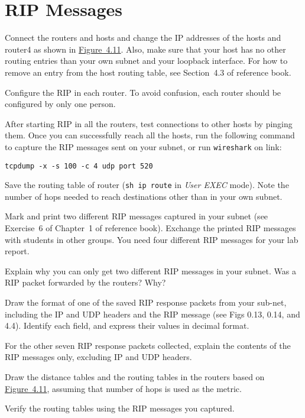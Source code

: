 \documentclass{../UTNetLab}
\begin{document}
\section{RIP Messages}
    Connect the routers and hosts and change the IP addresses of the hosts and router4 as shown in \hyperref[fig:4.11]{Figure~4.11}.
    Also, make sure that your host has no other routing entries than your own subnet and your loopback interface.
    For how to remove an entry from the host routing table, see Section~4.3 of reference book.

    Configure the RIP in each router.
    To avoid confusion, each router should be configured by only one person.

    After starting RIP in all the routers, test connections to other hosts by pinging them.
    Once you can successfully reach all the hosts, run the following command to capture the RIP messages sent on your subnet, or run \lstinline{wireshark} on link:
    \begin{lstlisting}
tcpdump -x -s 100 -c 4 udp port 520
    \end{lstlisting}

    Save the routing table of router (\lstinline{sh ip route} in \textit{User EXEC} mode).
    Note the number of hops needed to reach destinations other than in your own subnet.

    Mark and print two different RIP messages captured in your subnet (see Exercise~6 of Chapter~1 of reference book).
    Exchange the printed RIP messages with students in other groups.
    You need four different RIP messages for your lab report.
    
    \begin{report}
    \item Explain why you can only get two different RIP messages in your subnet.
    Was a RIP packet forwarded by the routers?
    Why?
    
    \item Draw the format of one of the saved RIP response packets from your sub-net, including the IP and UDP headers and the RIP message (see Figs 0.13, 0.14, and 4.4).
    Identify each field, and express their values in decimal format.
    
    \item For the other seven RIP response packets collected, explain the contents of the RIP messages only, excluding IP and UDP headers.

    
    \item Draw the distance tables and the routing tables in the routers based on \hyperref[fig:4.11]{Figure~4.11}, assuming that number of hops is used as the metric.

    \item Verify the routing tables using the RIP messages you captured.
    \end{report}
\end{document}
